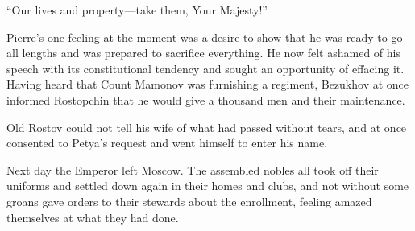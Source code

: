 ``Our lives and property---take them, Your Majesty!''

Pierre's one feeling at the moment was a desire to show that he
was ready to go all lengths and was prepared to sacrifice
everything. He now felt ashamed of his speech with its
constitutional tendency and sought an opportunity of effacing
it. Having heard that Count Mamonov was furnishing a regiment,
Bezukhov at once informed Rostopchin that he would give a
thousand men and their maintenance.

Old Rostov could not tell his wife of what had passed without
tears, and at once consented to Petya's request and went himself
to enter his name.

Next day the Emperor left Moscow. The assembled nobles all took
off their uniforms and settled down again in their homes and
clubs, and not without some groans gave orders to their stewards
about the enrollment, feeling amazed themselves at what they had
done.

